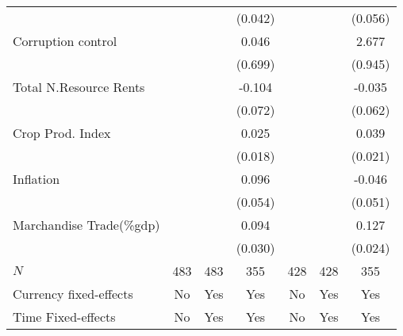 \begin{table}[H]
\begin{adjustbox}{max width=\textwidth}
\begin{tabular}{l*{6}{c}}
            &                     &                     &     (0.042)         &                     &                     &     (0.056)         \\
\addlinespace
Corruption control&                     &                     &       0.046         &                     &                     &       2.677\sym{***}\\
            &                     &                     &     (0.699)         &                     &                     &     (0.945)         \\
\addlinespace
Total N.Resource Rents&                     &                     &      -0.104         &                     &                     &      -0.035         \\
            &                     &                     &     (0.072)         &                     &                     &     (0.062)         \\
\addlinespace
Crop Prod. Index&                     &                     &       0.025         &                     &                     &       0.039\sym{*}  \\
            &                     &                     &     (0.018)         &                     &                     &     (0.021)         \\
\addlinespace
Inflation   &                     &                     &       0.096\sym{*}  &                     &                     &      -0.046         \\
            &                     &                     &     (0.054)         &                     &                     &     (0.051)         \\
\addlinespace
Marchandise Trade(\%gdp)&                     &                     &       0.094\sym{***}&                     &                     &       0.127\sym{***}\\
            &                     &                     &     (0.030)         &                     &                     &     (0.024)         \\
\midrule
\(N\)       &         483         &         483         &         355         &         428         &         428         &         355         \\
Currency fixed-effects&          No         &         Yes         &         Yes         &          No         &         Yes         &         Yes         \\
Time Fixed-effects&          No         &         Yes         &         Yes         &          No         &         Yes         &         Yes         \\

\end{tabular}
\end{adjustbox}
\end{table}
